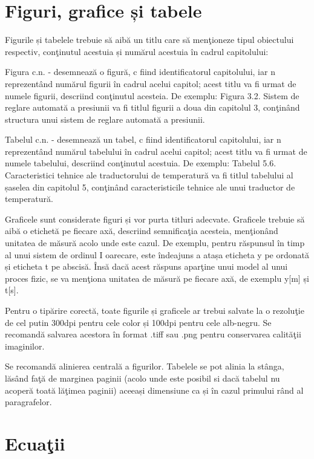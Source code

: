 \section{Figuri, grafice și tabele}

 Figurile și tabelele trebuie să aibă un titlu care să menţioneze tipul obiectului respectiv, conţinutul acestuia și numărul acestuia în cadrul capitolului:

	Figura c.n. - desemnează o figură, c fiind identificatorul capitolului, iar n reprezentând numărul figurii în cadrul acelui capitol; acest titlu va fi urmat de numele figurii, descriind conţinutul acesteia. De exemplu: Figura 3.2. Sistem de reglare automată a presiunii va fi titlul figurii a doua din capitolul 3, conţinând structura unui sistem de reglare automată a presiunii.

	Tabelul c.n. - desemnează un tabel, c fiind identificatorul capitolului, iar n reprezentând numărul tabelului în cadrul acelui capitol; acest titlu va fi urmat de numele tabelului, descriind conţinutul acestuia. De exemplu: Tabelul 5.6. Caracteristici tehnice ale traductorului de temperatură va fi titlul tabelului al șaselea din capitolul 5, conţinând caracteristicile tehnice ale unui traductor de temperatură.

	Graficele sunt considerate figuri și vor purta titluri adecvate. Graficele trebuie să aibă o etichetă pe fiecare axă, descriind semnificaţia acesteia, menţionând unitatea de măsură acolo unde este cazul. De exemplu, pentru răspunsul în timp al unui sistem de ordinul I oarecare, este îndeajuns a atașa eticheta y pe ordonată și eticheta t pe abscisă. Însă dacă acest răspuns aparţine unui model al unui proces fizic, se va menţiona unitatea de măsură pe fiecare axă, de exemplu y[m] și t[s].

	Pentru o tipărire corectă, toate figurile și graficele ar trebui salvate la o rezoluţie de cel putin 300dpi pentru cele color și 100dpi pentru cele alb-negru. Se recomandă salvarea acestora în format .tiff sau .png pentru conservarea calităţii imaginilor.

	Se recomandă alinierea centrală a figurilor. Tabelele se pot alinia la stânga, lăsând faţă de marginea paginii (acolo unde este posibil si dacă tabelul nu acoperă toată lăţimea paginii) aceeași dimensiune ca și în cazul primului rând al paragrafelor.

\section{Ecuaţii}

